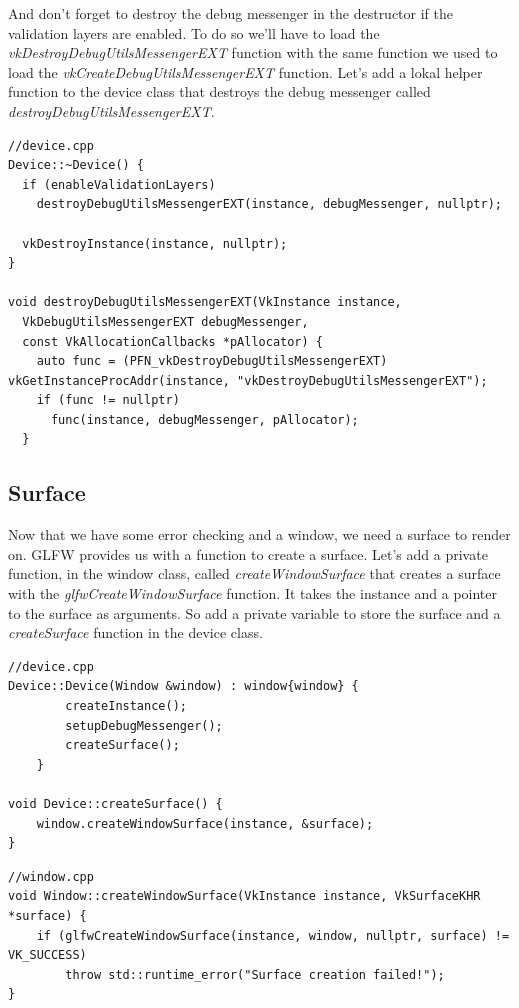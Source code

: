 \documentclass[12pt]{report} \usepackage{preamble}
\begin{document}
And don't forget to destroy the debug messenger in the destructor if the validation layers are enabled.
To do so we'll have to load the \textit{vkDestroyDebugUtilsMessengerEXT} function with the same
function we used to load the \textit{vkCreateDebugUtilsMessengerEXT} function. Let's add a lokal helper function
to the device class that destroys the debug messenger called \textit{destroyDebugUtilsMessengerEXT}.

\begin{lstlisting}[Language=C++]
//device.cpp
Device::~Device() {
  if (enableValidationLayers)
    destroyDebugUtilsMessengerEXT(instance, debugMessenger, nullptr);

  vkDestroyInstance(instance, nullptr);
}

void destroyDebugUtilsMessengerEXT(VkInstance instance, 
  VkDebugUtilsMessengerEXT debugMessenger, 
  const VkAllocationCallbacks *pAllocator) {
    auto func = (PFN_vkDestroyDebugUtilsMessengerEXT) vkGetInstanceProcAddr(instance, "vkDestroyDebugUtilsMessengerEXT");
    if (func != nullptr) 
      func(instance, debugMessenger, pAllocator);
  }
\end{lstlisting}

\subsection{Surface}

Now that we have some error checking and a window, we need a surface to render on.
\ac{GLFW} provides us with a function to create a surface. Let's add a private function,
in the window class, called
\textit{createWindowSurface} that creates a surface with the \textit{glfwCreateWindowSurface} function.
It takes the instance and a pointer to the surface as arguments. So add a private variable
to store the surface and a \textit{createSurface} function in the device class.

\begin{lstlisting}[Language=C++]
//device.cpp
Device::Device(Window &window) : window{window} {
		createInstance();
		setupDebugMessenger();
		createSurface();
	}

void Device::createSurface() {
	window.createWindowSurface(instance, &surface);
}
\end{lstlisting}

\begin{lstlisting}[Language=C++]
//window.cpp
void Window::createWindowSurface(VkInstance instance, VkSurfaceKHR *surface) {
	if (glfwCreateWindowSurface(instance, window, nullptr, surface) != VK_SUCCESS)
		throw std::runtime_error("Surface creation failed!");
}
\end{lstlisting}
\end{document}
